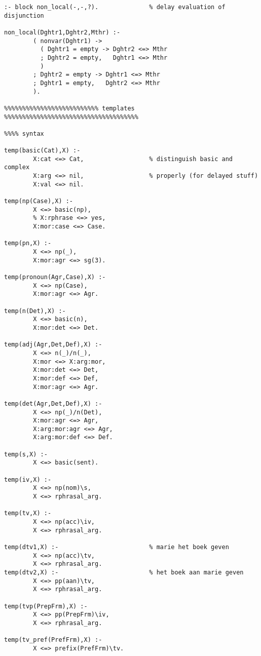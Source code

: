 \begin{verbatim}
:- block non_local(-,-,?).              % delay evaluation of disjunction 

non_local(Dghtr1,Dghtr2,Mthr) :-                
        ( nonvar(Dghtr1) ->                      
          ( Dghtr1 = empty -> Dghtr2 <=> Mthr
          ; Dghtr2 = empty,   Dghtr1 <=> Mthr
          )
        ; Dghtr2 = empty -> Dghtr1 <=> Mthr
        ; Dghtr1 = empty,   Dghtr2 <=> Mthr
        ).
        
%%%%%%%%%%%%%%%%%%%%%%%%%% templates %%%%%%%%%%%%%%%%%%%%%%%%%%%%%%%%%%%%%

%%%% syntax

temp(basic(Cat),X) :-
        X:cat <=> Cat,                  % distinguish basic and complex
        X:arg <=> nil,                  % properly (for delayed stuff)
        X:val <=> nil.
        
temp(np(Case),X) :-
        X <=> basic(np),
        % X:rphrase <=> yes,
        X:mor:case <=> Case.
        
temp(pn,X) :-
        X <=> np(_),
        X:mor:agr <=> sg(3).
        
temp(pronoun(Agr,Case),X) :-
        X <=> np(Case),
        X:mor:agr <=> Agr.

temp(n(Det),X) :-
        X <=> basic(n),
        X:mor:det <=> Det.
                
temp(adj(Agr,Det,Def),X) :-
        X <=> n(_)/n(_),
        X:mor <=> X:arg:mor,
        X:mor:det <=> Det,
        X:mor:def <=> Def,
        X:mor:agr <=> Agr.
                        
temp(det(Agr,Det,Def),X) :-
        X <=> np(_)/n(Det),
        X:mor:agr <=> Agr,
        X:arg:mor:agr <=> Agr,
        X:arg:mor:def <=> Def.
        
temp(s,X) :-
        X <=> basic(sent).
        
temp(iv,X) :-
        X <=> np(nom)\s,
        X <=> rphrasal_arg.
        
temp(tv,X) :-
        X <=> np(acc)\iv,
        X <=> rphrasal_arg.

temp(dtv1,X) :-                         % marie het boek geven
        X <=> np(acc)\tv,
        X <=> rphrasal_arg.
temp(dtv2,X) :-                         % het boek aan marie geven
        X <=> pp(aan)\tv,
        X <=> rphrasal_arg.
        
temp(tvp(PrepFrm),X) :-
        X <=> pp(PrepFrm)\iv,
        X <=> rphrasal_arg.
        
temp(tv_pref(PrefFrm),X) :-
        X <=> prefix(PrefFrm)\tv.


\end{verbatim}
